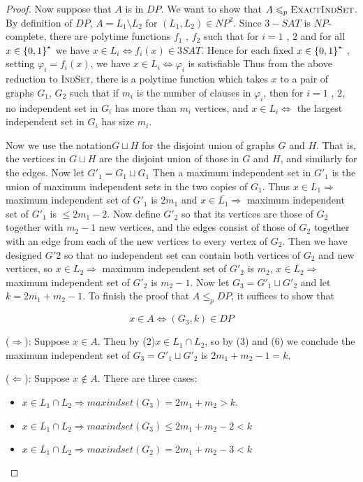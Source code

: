 \begin{proof}
    Now suppose that $A$ is in $DP$. We want to show that $A \leqslant_p \textsc{ExactIndSet}$. By definition of $DP$, $A = L_1 \setminus L_2$ for $(L_1,L_2) \in NP^2$. Since $3-SAT$ is $NP$-complete, there are polytime functions $f_1$ , $f_2$ such that for $i = 1$ , $2$ and for all  $x \in \left\{  0 , 1  \right\}^\star$ we have $x \in L_i \Leftrightarrow f_i ( x ) \in 3 SAT$. Hence for each fixed $x \in \left\{  0 , 1  \right\}^\star$ , setting $\varphi_i = f_i(x)$, we have  $x \in L_i \Leftrightarrow \varphi_i$ is satisfiable Thus from the above reduction to \textsc{IndSet}, there is a polytime function which takes $x$ to a pair of graphs $G_1$, $G_2$ such that if $m_i$ is the number of clauses in $\varphi_i$, then for $i = 1$ , $2$, no independent set in $G_i$ has more than $m_i$ vertices, and $x \in  L_i \Leftrightarrow$ the largest independent set in $G_i$ has size $m_i$.
    
    Now we use the notation$ G\sqcup H$ for the disjoint union of graphs $G$ and $H$. That is, the vertices in $G\sqcup H$ are the disjoint union of those in $G$ and $H$, and similarly for the edges. Now let $G'_1=G_1\sqcup G_1$ Then a maximum independent set in $G'_1$ is the union of maximum independent sets in the two copies of $G_1$. Thus $x\in L_1\Rightarrow$ maximum independent set of $G'_1$ is $2m_1$ and $x\in \overline{L_1} \Rightarrow$ maximum independent set of $G'_1$ is $\leqslant 2m_1-2$. Now define $G'_2$ so that its vertices are those of $G_2$ together with $m_2-1$ new vertices, and the edges consist of those of $G_2$ together with an edge from each of the new vertices to every vertex of $G_2$. Then we have designed $G'2$ so that no independent set can contain both vertices of $G_2$ and new vertices, so $x\in L_2 \Rightarrow$ maximum independent set of $G'_2$ is $m_2$, $x\in \overline{L_2} \Rightarrow$ maximum independent set of $G'_2$ is $m_2-1$. Now let $G_3=G'_1\sqcup G'_2$ and let $k= 2m_1+m_2-1$. To finish the proof that $A\leqslant_p DP$, it suffices to show that 
    
    \begin{lemma}
        $$x\in A\Leftrightarrow(G_3, k)\in DP$$
    \end{lemma}
    
    ($\Rightarrow$): Suppose $x\in A$. Then by (2)$x\in L_1 \cap L_2$, so by (3) and (6) we conclude the maximum independent set of $G_3=G'_1\sqcup  G'_2$ is $2m_1+m_2-1 =k$.
    
    ($\Leftarrow$): Suppose $x \not\in A$. There are three cases:
    \begin{itemize}
        \item $x\in L_1 \cap L_2\Rightarrow maxindset(G_3) = 2m_1+m_2> k$.
        \item $x\in L_1 \cap L_2\Rightarrow maxindset(G_3)\leqslant 2m_1+m_2-2< k$
        \item $x\in L_1 \cap L_2\Rightarrow maxindset(G_2) = 2m_1+m_2-3< k$
    \end{itemize}
\end{proof}

